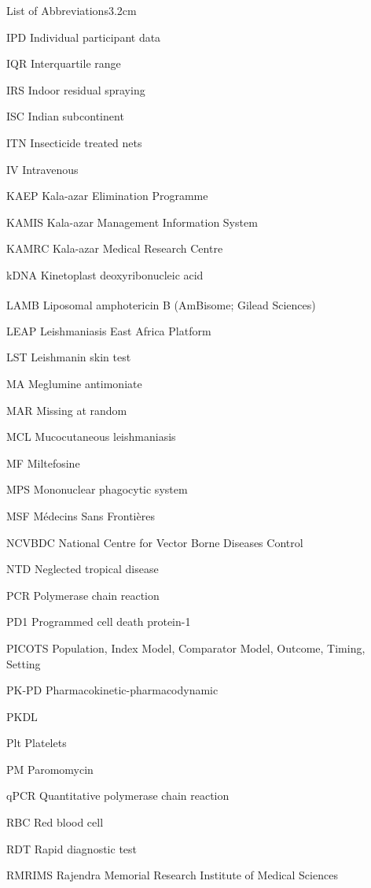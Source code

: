 \begin{mclistof}{List of Abbreviations}{3.2cm}
  \item[IPD] Individual participant data
  \item[IQR] Interquartile range
  \item[IRS] Indoor residual spraying
  \item[ISC] Indian subcontinent
  \item[ITN] Insecticide treated nets
  \item[IV] Intravenous
  \item[KAEP] Kala-azar Elimination Programme
  \item[KAMIS] Kala-azar Management Information System
  \item[KAMRC] Kala-azar Medical Research Centre
  \item[kDNA] Kinetoplast deoxyribonucleic acid
  \item[LAMB] Liposomal amphotericin B (AmBisome\textsuperscript{\textregistered}; Gilead Sciences)
  \item[LEAP] Leishmaniasis East Africa Platform
  \item[LST] Leishmanin skin test
  \item[MA] Meglumine antimoniate
  \item[MAR] Missing at random
  \item[MCL] Mucocutaneous leishmaniasis
  \item[MF] Miltefosine
  \item[MPS] Mononuclear phagocytic system
  \item[MSF] Médecins Sans Frontières
  \item[NCVBDC] National Centre for Vector Borne Diseases Control
  \item[NTD] Neglected tropical disease
  \item[PCR] Polymerase chain reaction
  \item[PD1] Programmed cell death protein-1
  \item[PICOTS] Population, Index Model, Comparator Model, Outcome, Timing, Setting
  \item[PK-PD] Pharmacokinetic-pharmacodynamic
  \item[PKDL] 
  \item[Plt] Platelets
  \item[PM] Paromomycin
  \item[qPCR] Quantitative polymerase chain reaction
  \item[RBC] Red blood cell
  \item[RDT] Rapid diagnostic test
  \item[RMRIMS] Rajendra Memorial Research Institute of Medical Sciences

\end{mclistof}
